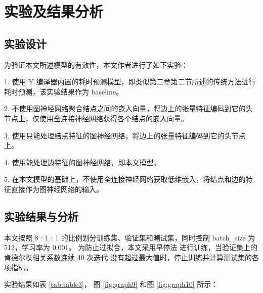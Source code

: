 
\chapter{实验及结果分析}

\section{实验设计}

为验证本文所述模型的有效性，本文作者进行了如下实验：

1. 使用 Y 编译器内置的耗时预测模型，即类似第二章第二节所述的传统方法进行耗时预测，该实验结果作为 baseline。

2. 不使用图神经网络聚合结点之间的嵌入向量，将边上的张量特征编码到它的头节点上，仅使用全连接神经网络获得各个结点的嵌入向量。

3. 使用只能处理结点特征的图神经网络，将边上的张量特征编码到它的头节点上。

4. 使用能处理边特征的图神经网络，即本文模型。

5. 在本文模型的基础上，不使用全连接神经网络获取低维嵌入，将结点和边的特征直接作为图神经网络的输入。

\section{实验结果与分析}

本文按照 8 : 1 : 1 的比例划分训练集、验证集和测试集，同时控制 batch\_size 为 512，学习率为 0.001。
为防止过拟合，本文采用早停法 \cite{earlystop} 进行训练，当验证集上的肯德尔秩相关系数连续 40 次迭代
没有超过最大值时，停止训练并计算测试集的各项指标。

实验结果如表 \ref{tab:table3}， 图 \ref{fig:graph9} 和图 \ref{fig:graph10} 所示：

